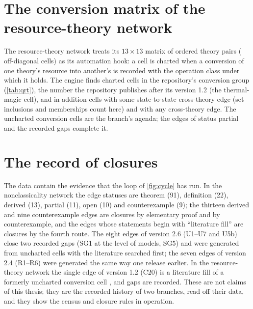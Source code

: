 \documentclass[11pt,a4paper,twoside,openany]{report}
\theoremstyle{plain}
\theoremstyle{definition}
\theoremstyle{remark}
\begin{document}
\section{The conversion matrix of the resource-theory network}
\begin{table}[htbp]\centering\small
\caption{Conversion matrix of the thirteen resource theories ($\blacksquare$ charted by the repository's conversion group; $\square$ other state-to-state cross-theory edge; $\cdot$ other cross-theory edge).}\label{tab:qrt}
\resizebox{0.9\textwidth}{!}{}
\end{table}
The resource-theory network treats its $13\times 13$ matrix of ordered theory pairs (\NqrtCells{} off-diagonal cells) as its automation hook: a cell is charted when a conversion of one theory's resource into another's is recorded with the operation class under which it holds. The engine finds \NqrtCharted{} charted cells in the repository's conversion group (\cref{tab:qrt}), the number the repository publishes after its version 1.2 (the thermal-magic cell), and in addition \NqrtChartedStateState{} cells with some state-to-state cross-theory edge (set inclusions and memberships count here) and \NqrtCrossAny{} with any cross-theory edge. The \NqrtUncharted{} uncharted conversion cells are the branch's agenda; the \NqrtPartialEdges{} edges of status partial and the \NqrtGaps{} recorded gaps complete it.

\section{The record of closures}
The data contain the evidence that the loop of \cref{fig:cycle} has run. In the nonclassicality network the edge statuses are theorem (91), definition (22), derived (13), partial (11), open (10) and counterexample (9); the thirteen derived and nine counterexample edges are closures by elementary proof and by counterexample, and the edges whose statements begin with ``literature fill'' are closures by the fourth route. The eight edges of version 2.6 (U1--U7 and U5b) close two recorded gaps (SG1 at the level of models, SG5) and were generated from uncharted cells with the literature searched first; the seven edges of version 2.4 (R1--R6) were generated the same way one release earlier. In the resource-theory network the single edge of version 1.2 (C20) is a literature fill of a formerly uncharted conversion cell \citep{deoliveira2025}, and \NqrtGaps{} gaps are recorded. These are not claims of this thesis; they are the recorded history of two branches, read off their data, and they show the census and closure rules in operation.
\end{document}
